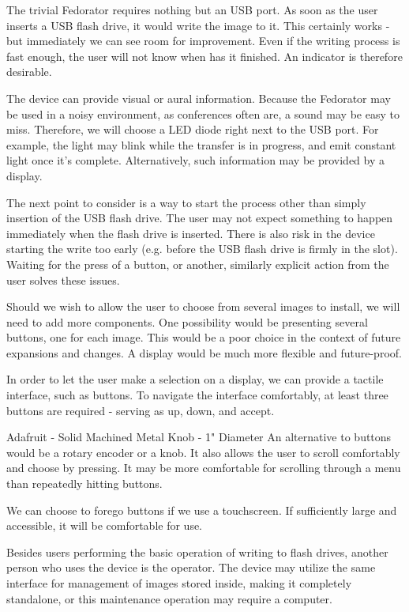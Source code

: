         The trivial Fedorator requires nothing but an USB port.  As soon as the user inserts a USB flash drive, it would write the image to it.  This certainly works - but immediately we can see room for improvement.  Even if the writing process is fast enough, the user will not know when has it finished.  An indicator is therefore desirable.
        
        The device can provide visual or aural information.  Because the Fedorator may be used in a noisy environment, as conferences often are, a sound may be easy to miss.  Therefore, we will choose a LED diode right next to the USB port.  For example, the light may blink while the transfer is in progress, and emit constant light once it's complete.  Alternatively, such information may be provided by a display.
        
        The next point to consider is a way to start the process other than simply insertion of the USB flash drive.  The user may not expect something to happen immediately when the flash drive is inserted.  There is also risk in the device starting the write too early (e.g. before the USB flash drive is firmly in the slot).  Waiting for the press of a button, or another, similarly explicit action from the user solves these issues.
        
        Should we wish to allow the user to choose from several images to install, we will need to add more components.  One possibility would be presenting several buttons, one for each image.  This would be a poor choice in the context of future expansions and changes.  A display would be much more flexible and future-proof.
        
        In order to let the user make a selection on a display, we can provide a tactile interface, such as buttons.  To navigate the interface comfortably, at least three buttons are required - serving as up, down, and accept.
        
            {Adafruit - Solid Machined Metal Knob - 1" Diameter  \cite{adafruit-knob}}
        An alternative to buttons would be a rotary encoder or a knob.  It also allows the user to scroll comfortably and choose by pressing.  It may be more comfortable for scrolling through a menu than repeatedly hitting buttons.
        
        We can choose to forego buttons if we use a touchscreen.  If sufficiently large and accessible, it will be comfortable for use.
        
        Besides users performing the basic operation of writing to flash drives, another person who uses the device is the operator.  The device may utilize the same interface for management of images stored inside, making it completely standalone, or this maintenance operation may require a computer.
    

